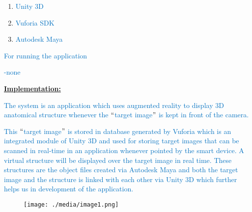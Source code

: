 \documentclass[12pt]{article}
\begin{document}
\begin{enumerate}
	\item \textcolor[HTML]{0070C0}{Unity 3D}\par

	\item \textcolor[HTML]{0070C0}{Vuforia SDK}\par

	\item \textcolor[HTML]{0070C0}{Autodesk Maya}
\end{enumerate}\par

\textcolor[HTML]{0070C0}{For running the application}\par

\textcolor[HTML]{0070C0}{-none}\par

{\fontsize{14pt}{16.8pt}\selectfont \textbf{\uline{Implementation:}}\par}\par

\textcolor[HTML]{0070C0}{The system is an application which uses augmented reality to display 3D anatomical structure whenever the $``$target image$"$  is kept in front of the camera.}\par

\textcolor[HTML]{0070C0}{This $``$target image$"$  is stored in database generated by Vuforia which is an integrated module of Unity 3D and used for storing target images that can be scanned in real-time in an application whenever pointed by the smart device. A virtual structure will be displayed over the target image in real time. These structures are the object files created via Autodesk Maya and both the target image and the structure is linked with each other via Unity 3D which further helps us in development of the application.}\par




\begin{figure}[H]
	\begin{Center}
		\texttt{[image: ./media/image1.png]}
	\end{Center}
\end{figure}



\par
\end{document}
